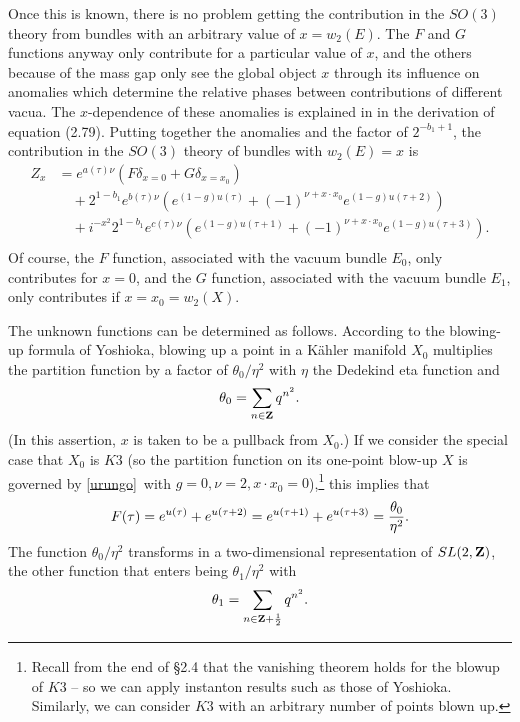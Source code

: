 \documentclass[12pt]{article}
\numberwithin{equation}{section}
\begin{document}
Once this is known, there is no problem getting the contribution
in the $SO(3)$ theory from bundles with an arbitrary value of
$x=w_2(E)$.  The $F$ and $G$ functions anyway only contribute
for a particular value of $x$, and the others because of the mass
gap only see the global object $x$ through its influence
on anomalies which determine the relative phases between contributions
of different vacua.  The  $x$-dependence of these anomalies
is explained   in \cite{switten} in the derivation of equation (2.79).
Putting together the anomalies and the factor of $2^{-b_1+1}$, the
contribution in the $SO(3)$ theory of bundles with $w_2(E)=x$ is
\begin{equation}
  \label{urungo}
  \begin{aligned}
    Z_{x}
    &= e^{a(\tau)\nu}\left(F\delta_{x=0}+G\delta_{x=x_0}\right)\\
    &\quad
    +2^{1-b_1}e^{b(\tau)\nu}\left(e^{(1-g)u(\tau)}+(-1)^{\nu+x\cdot
    x_0} e^{(1-g)u(\tau+2)}\right)\\
    &\quad +i^{-x^2}2^{1-b_1}e^{c(\tau)\nu}\left(e^{(1-g)u(\tau+1)}+
    (-1)^{\nu+x\cdot x_0}e^{(1-g)u(\tau+3)}\right).\\
  \end{aligned}
\end{equation}
Of course, the $F$ function, associated with the vacuum bundle $E_0$,
only contributes for $x=0$, and the $G$ function, associated with the
vacuum bundle $E_1$, only contributes if $x=x_0=w_2(X)$.

The unknown
functions can be determined as follows.  According to the blowing-up
formula of Yoshioka, blowing up a point in a K\"ahler manifold $X_0$
multiplies
the partition function by a factor of $\theta_0/\eta^2$ with
$\eta$ the Dedekind eta function and
\begin{equation}
  \label{ompo}
  \theta_0=\sum_{n\in {\bf Z}} q^{n^2}.
\end{equation}
(In this assertion, $x$ is taken to be a pullback from $X_0$.)
If we consider the special case that $X_0$ is $K3$ (so the partition
  function on its one-point blow-up $X$
  is governed by \eqref{urungo}\ with $g=0,\nu=2, x\cdot
x_0=0$),\footnote{Recall from the end of  \S2.4 that the vanishing
  theorem holds for the blowup of $K3$ -- so we can apply instanton
  results such as those of Yoshioka.  Similarly, we can consider $K3$
with an arbitrary number of points blown up.}
this implies that
\begin{equation}
  \label{impod}
  F(\tau)=e^{u(\tau)}+e^{u(\tau+2)}=e^{u(\tau+1)}+e^{u(\tau+3)}
  ={\theta_0\over\eta^2}.
\end{equation}
The function $\theta_0/\eta^2$ transforms in a two-dimensional representation
of $SL(2,{\bf Z})$, the other function that enters being $\theta_1/\eta^2$ with
\begin{equation}
  \label{osn}
  \theta_1=\sum_{n\in {\bf Z}+{1\over 2}}q^{n^2}.
\end{equation}
\end{document}
